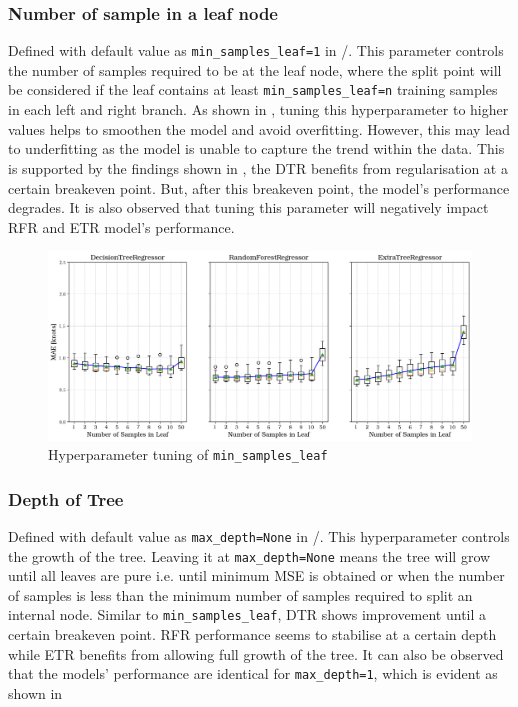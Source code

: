 \subsubsection*{Number of sample in a leaf node}\label{sec:min_samples_leaf}

Defined with default value as {\tt min\_samples\_leaf=1} in \scikit/. This parameter controls the number of samples required to be at the leaf node, where the split point will be considered if the leaf contains at least {\tt min\_samples\_leaf=n} training samples in each left and right branch. As shown in , tuning this hyperparameter to higher values helps to smoothen the model and avoid overfitting. However, this may lead to underfitting as the model is unable to capture the trend within the data. This is supported by the findings shown in , the DTR benefits from regularisation at a certain breakeven point. But, after this breakeven point, the model's performance degrades. It is also observed that tuning this parameter will negatively impact RFR and ETR model's performance. 

\begin{figure}[h]
    \centering
        \includegraphics[width=.85\textwidth]{02_figures/hpo_min_samples_leaf_mae.png}
        \caption{Hyperparameter tuning of {\tt min\_samples\_leaf}}
        \label{fig:hpo_min_samples_leaf}
\end{figure}

\subsubsection*{Depth of Tree}\label{sec:max_depth}

Defined with default value as {\tt max\_depth=None} in \scikit/. This hyperparameter controls the growth of the tree. Leaving it at {\tt max\_depth=None} means the tree will grow until all leaves are pure i.e. until minimum MSE is obtained or when the number of samples is less than the minimum number of samples required to split an internal node. Similar to {\tt min\_samples\_leaf}, DTR shows improvement until a certain breakeven point. RFR performance seems to stabilise at a certain depth while ETR benefits from allowing full growth of the tree. It can also be observed that the models' performance are identical for {\tt max\_depth=1}, which is evident as shown in   

